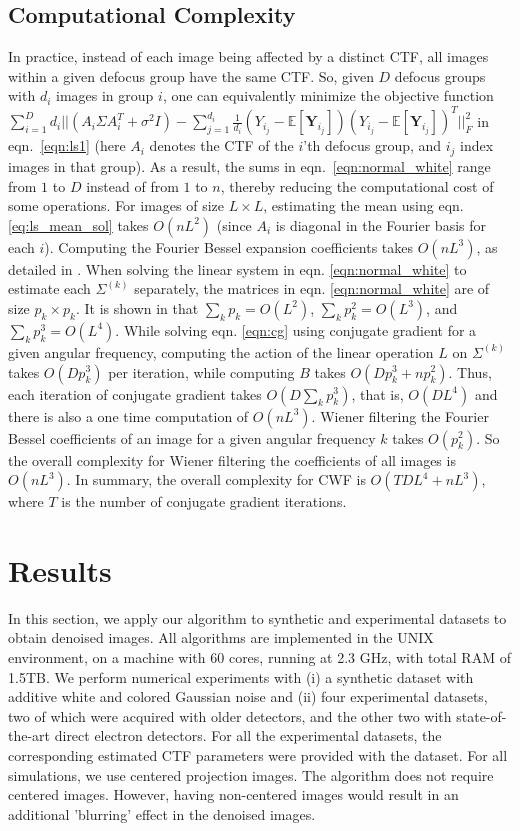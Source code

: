\documentclass[review]{elsarticle}
\begin{document}
\subsection{Computational Complexity}
\label{sec:complexity}
In practice, instead of each image being affected by a distinct CTF, all images 
within a given defocus group have the same CTF. So, given $D$ defocus groups 
with $d_i$
images in group $i$, one can equivalently minimize the objective function
 $\sum_{i=1}^D d_i ||(A_i \Sigma A_i^T + \sigma^2 I) -
 \sum_{j=1}^{d_i} \frac{1}{d_i}(Y_{i_j} - \mathbb{E}[\textbf{Y}_{i_j}]) (Y_{i_j} - 
\mathbb{E}[\textbf{Y}_{i_j}])^T
||_F^2 $ in eqn.\ \ref{eqn:ls1} (here $A_i$ denotes the CTF of the $i$'th defocus group, and $i_j$ index images in that group). 
As a result, the sums in eqn.\ \ref{eqn:normal_white} range 
from $1$ to $D$ instead of from $1$ to $n$, thereby reducing the computational cost 
of some operations.
For images of size $L \times L$, estimating the mean using eqn. 
\ref{eq:ls_mean_sol} takes $O(nL^2)$ (since $A_i$ is diagonal
in the Fourier basis for each $i$). Computing the Fourier Bessel expansion 
coefficients takes $O(nL^3)$, as detailed
in \cite{ffbspca}. When solving the linear system in eqn. \ref{eqn:normal_white}
to estimate each $\Sigma^{(k)}$ separately, the matrices in eqn. 
\ref{eqn:normal_white} are of size $p_k \times p_k$.
It is shown in \cite{ffbspca} that $\sum_k p_k=O(L^2)$, $\sum_k p_k^2=O(L^3)$, 
and $\sum_k p_k^3=O(L^4)$.
While solving eqn. \ref{eqn:cg} using conjugate gradient for a given angular 
frequency, computing the 
action of the linear operation $L$ on $\Sigma^{(k)}$ takes
$O(Dp_k^3)$ per iteration,
while computing $B$ takes $O(Dp_k^3+np_k^2)$. Thus, each iteration of 
conjugate gradient takes
$O(D \sum_k p_k^3)$, that is,
$O(DL^4)$ and there is also a one time computation of $O(nL^3)$.
Wiener filtering the Fourier Bessel coefficients of an image for a given 
angular frequency $k$ takes $O(p_k^2)$. So the overall
complexity for Wiener filtering the coefficients of all images is $O(nL^3)$. 
In summary, the overall complexity for CWF is 
$O(TDL^4 + nL^3)$, where $T$ is the number of conjugate gradient iterations. 


\section{Results}
\label{sec:results}
In this section, we apply our algorithm to synthetic and experimental datasets 
to obtain denoised images. All algorithms are
implemented in the UNIX environment, on a machine with 60 cores,
running at 2.3 GHz, with total RAM of 1.5TB. We perform numerical experiments 
with
(i) a synthetic dataset with additive white and colored Gaussian noise and (ii) 
four experimental
datasets, two of which were acquired with older detectors, and the other two 
with state-of-the-art
direct electron detectors. For all the experimental datasets, the corresponding
estimated CTF parameters were provided with the dataset. For all simulations,
we use centered projection images. The algorithm does not require centered images. 
However, having non-centered images would result in an additional
'blurring' effect in the denoised images.
\end{document}
